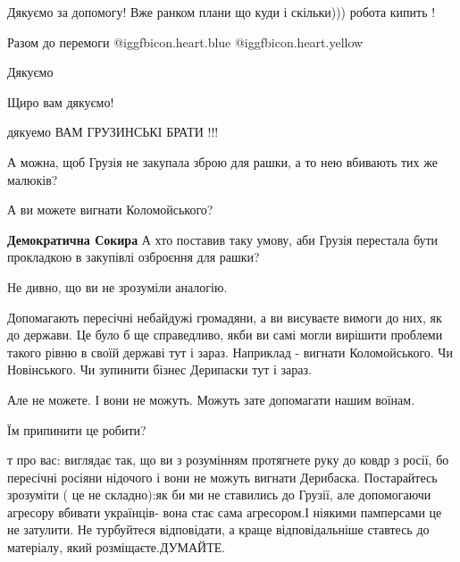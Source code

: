  
 
 
 
 
\zzSecCmt

\begin{itemize} %

Дякуємо за допомогу! Вже ранком плани що куди і скільки))) робота кипить !

Разом до перемоги  @igg{fbicon.heart.blue}  @igg{fbicon.heart.yellow} 

Дякуємо

Щиро вам дякуємо!

дякуемо ВАМ ГРУЗИНСЬКI БРАТИ !!!

А можна, щоб Грузія не закупала зброю для рашки, а то нею вбивають тих же малюків?

\begin{itemize} %
А ви можете вигнати Коломойського?

\textbf{Демократична Сокира} А хто поставив таку умову, аби Грузія перестала бути прокладкою в закупівлі озброєння для рашки?


Не дивно, що ви не зрозуміли аналогію.

Допомагають пересічні небайдужі громадяни, а ви висуваєте вимоги до них, як до
держави. Це було б ще справедливо, якби ви самі могли вирішити проблеми такого
рівню в своїй державі тут і зараз. Наприклад - вигнати Коломойського. Чи
Новінського. Чи зупинити бізнес Дерипаски тут і зараз.

Але не можете. І вони не можуть. Можуть зате допомагати нашим воїнам.

Їм припинити це робити?


т про вас: виглядає так, що ви з розумінням протягнете руку до ковдр з росії,
бо пересічні росіяни нідочого і вони не можуть вигнати Дерибаска. Постарайтесь
зрозуміти ( це не складно):як би ми не ставились до Грузії, але допомогаючи
агресору вбивати українців- вона стає сама агресором.І ніякими памперсами це не
затулити. Не турбуйтеся відповідати, а краще відповідальніше ставтесь до
матеріалу, який розміщаєте.ДУМАЙТЕ.


\end{itemize}
\end{itemize}
